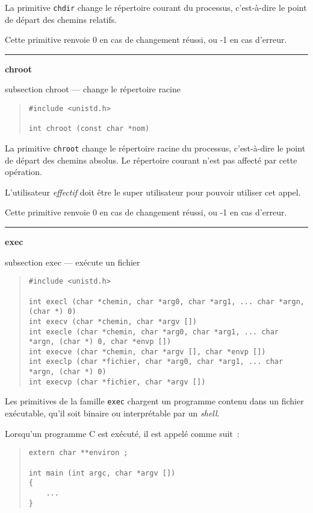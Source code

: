\documentclass [twoside] {report}
\newcommand {\primitive} [1]
    {
	\phantomsection
	{\large \bf #1}
	\addcontentsline {toc} {subsection} {#1}
    }
\newcommand {\separation}
    {
	\vspace {5mm}
	\nopagebreak
	\hrule
    }
\begin{document}
La primitive {\tt chdir} change le répertoire
courant du processus, c'est-à-dire le point de
départ des chemins relatifs.

Cette primitive renvoie 0 en cas de changement
réussi, ou -1 en cas d'erreur.




\separation
\primitive {chroot} --- change le répertoire racine

\begin {quote}
\begin {verbatim}
#include <unistd.h>

int chroot (const char *nom)
\end{verbatim}
\end {quote}

La primitive {\tt chroot} change le répertoire
racine du processus, c'est-à-dire le point de
départ des chemins absolus. Le répertoire courant
n'est pas affecté par cette opération.

L'utilisateur {\em effectif} doit être le super
utilisateur pour pouvoir utiliser cet appel.

Cette primitive renvoie 0 en cas de changement
réussi, ou -1 en cas d'erreur.




\separation
\primitive {exec} --- exécute un fichier

\begin {quote}
\begin {verbatim}
#include <unistd.h>

int execl (char *chemin, char *arg0, char *arg1, ... char *argn, (char *) 0)
int execv (char *chemin, char *argv [])
int execle (char *chemin, char *arg0, char *arg1, ... char *argn, (char *) 0, char *envp [])
int execve (char *chemin, char *argv [], char *envp [])
int execlp (char *fichier, char *arg0, char *arg1, ... char *argn, (char *) 0)
int execvp (char *fichier, char *argv [])
\end{verbatim}
\end {quote}

Les primitives de la famille {\tt exec} chargent un
programme contenu dans un fichier exécutable,
qu'il soit binaire ou interprétable par un
{\em shell}.

Lorsqu'un programme C est exécuté, il est appelé
comme suit~:

\begin {quote}
\begin {verbatim}
extern char **environ ;

int main (int argc, char *argv [])
{
    ...
}
\end{verbatim}
\end {quote}
\end{document}
